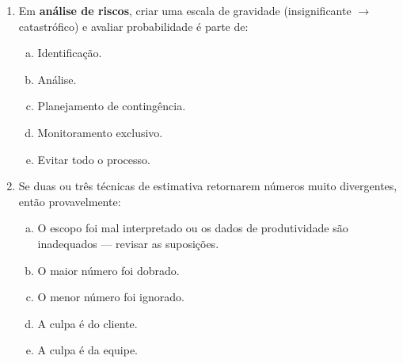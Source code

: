 \documentclass{beamer}
\begin{document}
\begin{frame}
    \begin{enumerate}
        \justifying
        \setcounter{enumi}{28}
        \item<1-2> Em \textbf{análise de riscos}, criar uma escala de gravidade (insignificante $\rightarrow$ catastrófico) e avaliar probabilidade é parte de:
        \begin{enumerate}[a)]
            \justifying
            \item<1-2> Identificação.
            \item<1-2> \alert<2>{Análise}.
            \item<1-2> Planejamento de contingência.
            \item<1-2> Monitoramento exclusivo.
            \item<1-2> Evitar todo o processo.
        \end{enumerate}
        \item<3-4> Se duas ou três técnicas de estimativa retornarem números muito divergentes, então provavelmente:
        \begin{enumerate}[a)]
            \justifying
            \item<3-4> \alert<4>{O escopo foi mal interpretado ou os dados de produtividade são inadequados — revisar as suposições}.
            \item<3-4> O maior número foi dobrado.
            \item<3-4> O menor número foi ignorado.
            \item<3-4> A culpa é do cliente.
            \item<3-4> A culpa é da equipe.
        \end{enumerate}
    \end{enumerate}
\end{frame}
\end{document}
